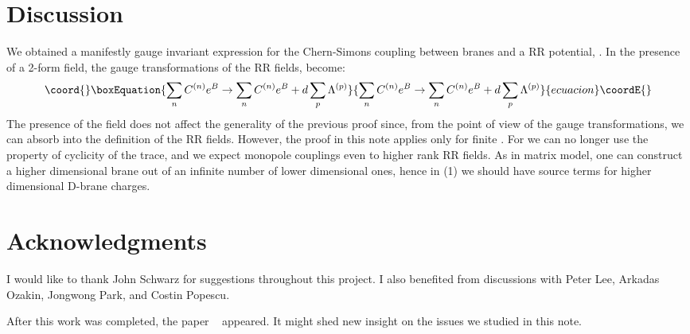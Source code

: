 \documentclass[a4paper,12pt]{article}
\begin{document}
\section{Discussion}

    We obtained a manifestly gauge invariant expression for the Chern-Simons coupling between \coordHE{}  \coordHE{} branes and a RR potential, \coordHE{}. In the presence of a 2-form \coordHE{} field, the gauge transformations of the RR fields, become:
\begin{equation}\coord{}\boxEquation{
\sum_n C^{(n)}e^B \rightarrow \sum_n C^{(n)}e^B + d\sum_p \Lambda^{(p)}
}{
\sum_n C^{(n)}e^B \rightarrow \sum_n C^{(n)}e^B + d\sum_p \Lambda^{(p)}
}{ecuacion}\coordE{}\end{equation}
The presence of the \coordHE{} field does not affect the generality of the previous proof since, from the point of view of the gauge transformations,  we can absorb \coordHE{} into the definition of the RR fields. However, the proof in this note applies only for finite \coordHE{}. For \coordHE{} we can no longer use the property of cyclicity of the trace, and we expect monopole couplings even to higher rank RR fields. As in  matrix model,  one can construct a higher dimensional brane  out of an infinite number of lower dimensional ones, hence in (1) we should have source terms for higher dimensional D-brane charges.  

\section{Acknowledgments}

 I would like to thank   John Schwarz for suggestions  throughout this project. I also benefited from discussions with  Peter Lee, Arkadas Ozakin, Jongwong Park, and Costin Popescu.
 
 After this work was completed, the paper ~\cite{emil} appeared. It  might shed new insight on the issues we studied in this note.  
\end{document}
